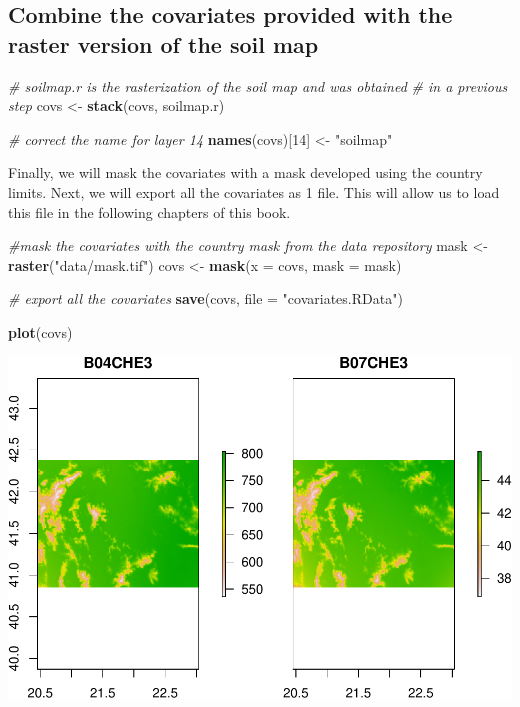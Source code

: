 \documentclass[10pt,b5paper,]{book}
\newenvironment{Shaded}{\begin{snugshade}}{\end{snugshade}}
\newcommand{\CommentTok}[1]{\textcolor[rgb]{0.56,0.35,0.01}{\textit{#1}}}
\newcommand{\DataTypeTok}[1]{\textcolor[rgb]{0.13,0.29,0.53}{#1}}
\newcommand{\DecValTok}[1]{\textcolor[rgb]{0.00,0.00,0.81}{#1}}
\newcommand{\KeywordTok}[1]{\textcolor[rgb]{0.13,0.29,0.53}{\textbf{#1}}}
\newcommand{\NormalTok}[1]{#1}
\newcommand{\StringTok}[1]{\textcolor[rgb]{0.31,0.60,0.02}{#1}}
\theoremstyle{definition}
\theoremstyle{definition}
\theoremstyle{definition}
\theoremstyle{remark}
\begin{document}
\hypertarget{combine-the-covariates-provided-with-the-raster-version-of-the-soil-map}{%
\subsection{Combine the covariates provided with the raster version of
the soil
map}\label{combine-the-covariates-provided-with-the-raster-version-of-the-soil-map}}

\begin{Shaded}
\begin{Highlighting}[]
\CommentTok{# soilmap.r is the rasterization of the soil map and was obtained}
\CommentTok{# in a previous step}
\NormalTok{covs <-}\StringTok{ }\KeywordTok{stack}\NormalTok{(covs, soilmap.r)}

\CommentTok{# correct the name for layer 14}
\KeywordTok{names}\NormalTok{(covs)[}\DecValTok{14}\NormalTok{] <-}\StringTok{ "soilmap"}
\end{Highlighting}
\end{Shaded}

Finally, we will mask the covariates with a mask developed using the
country limits. Next, we will export all the covariates as 1 file. This
will allow us to load this file in the following chapters of this book.

\begin{Shaded}
\begin{Highlighting}[]
\CommentTok{#mask the covariates with the country mask from the data repository}
\NormalTok{mask <-}\StringTok{ }\KeywordTok{raster}\NormalTok{(}\StringTok{"data/mask.tif"}\NormalTok{)}
\NormalTok{covs <-}\StringTok{ }\KeywordTok{mask}\NormalTok{(}\DataTypeTok{x =}\NormalTok{ covs, }\DataTypeTok{mask =}\NormalTok{ mask)}

\CommentTok{# export all the covariates }
\KeywordTok{save}\NormalTok{(covs, }\DataTypeTok{file =} \StringTok{"covariates.RData"}\NormalTok{)}

\KeywordTok{plot}\NormalTok{(covs)}
\end{Highlighting}
\end{Shaded}

\includegraphics{SOCMapping_files/figure-latex/unnamed-chunk-23-1.pdf}
\end{document}
